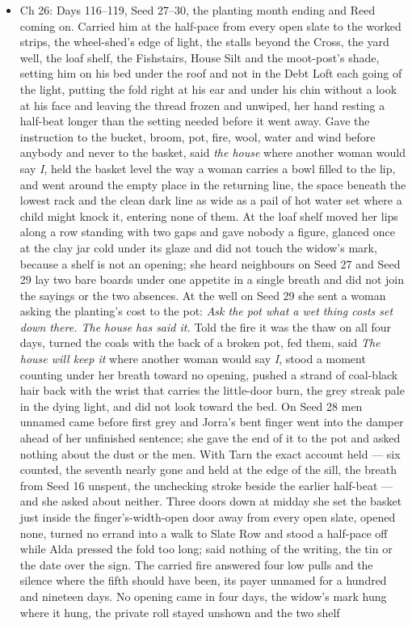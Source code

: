 \documentclass{design/chronicle}
\begin{document}
{\begin{itemize}[leftmargin=1.4em,itemsep=1pt,topsep=3pt,parsep=0pt]
\end{itemize}

\begin{itemize}[leftmargin=1.4em,itemsep=1pt,topsep=3pt,parsep=0pt]

\item Ch 26: Days 116–119, Seed 27–30, the planting month ending and Reed coming on. Carried him at the half-pace from every open slate to the worked strips, the wheel-shed’s edge of light, the stalls beyond the Cross, the yard well, the loaf shelf, the Fishstairs, House Silt and the moot-post’s shade, setting him on his bed under the roof and not in the Debt Loft each going of the light, putting the fold right at his ear and under his chin without a look at his face and leaving the thread frozen and unwiped, her hand resting a half-beat longer than the setting needed before it went away. Gave the instruction to the bucket, broom, pot, fire, wool, water and wind before anybody and never to the basket, said \emph{the house} where another woman would say \emph{I}, held the basket level the way a woman carries a bowl filled to the lip, and went around the empty place in the returning line, the space beneath the lowest rack and the clean dark line as wide as a pail of hot water set where a child might knock it, entering none of them. At the loaf shelf moved her lips along a row standing with two gaps and gave nobody a figure, glanced once at the clay jar cold under its glaze and did not touch the widow’s mark, because a shelf is not an opening; she heard neighbours on Seed 27 and Seed 29 lay two bare boards under one appetite in a single breath and did not join the sayings or the two absences. At the well on Seed 29 she sent a woman asking the planting’s cost to the pot: \emph{Ask the pot what a wet thing costs set down there. The house has said it.} Told the fire it was the thaw on all four days, turned the coals with the back of a broken pot, fed them, said \emph{The house will keep it} where another woman would say \emph{I}, stood a moment counting under her breath toward no opening, pushed a strand of coal-black hair back with the wrist that carries the little-door burn, the grey streak pale in the dying light, and did not look toward the bed. On Seed 28 men unnamed came before first grey and Jorra’s bent finger went into the damper ahead of her unfinished sentence; she gave the end of it to the pot and asked nothing about the dust or the men. With Tarn the exact account held — six counted, the seventh nearly gone and held at the edge of the sill, the breath from Seed 16 unspent, the unchecking stroke beside the earlier half-beat — and she asked about neither. Three doors down at midday she set the basket just inside the finger’s-width-open door away from every open slate, opened none, turned no errand into a walk to Slate Row and stood a half-pace off while Alda pressed the fold too long; said nothing of the writing, the tin or the date over the sign. The carried fire answered four low pulls and the silence where the fifth should have been, its payer unnamed for a hundred and nineteen days. No opening came in four days, the widow’s mark hung where it hung, the private roll stayed unshown and the two shelf 
\end{itemize}}
\end{document}
